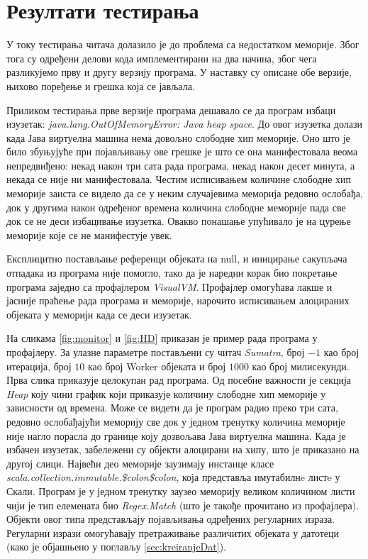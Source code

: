 \documentclass[12pt,oneside]{memoir}
\begin{document}
\section{Резултати тестирања}
\label{sec:rez}

У току тестирања читача долазило је до проблема са недостатком меморије. Због тога су одређени делови кода имплементирани на два начина, због чега разликујемо прву и другу верзију програма. У наставку су описане обе верзије, њихово поређење и грешка која се јављала.

Приликом тестирања прве верзије програма дешавало се да програм избаци изузетак: \textit{java.lang.OutOfMemoryError: Java heap space}. До овог изузетка долази када Јава виртуелна машина нема довољно слободне хип меморије. Оно што је било збуњујуће при појављивању ове грешке је што се она манифестовала веома непредвиђено: некад након три сата рада програма, некад након десет минута, а некада се није ни манифестовала. Честим исписивањем количине слободне хип меморије заиста се видело да се у неким случајевима меморија редовно ослобађа, док у другима након одређеног времена количина слободне меморије пада све док се не деси избацивање изузетка. Овакво понашање упућивало је на цурење меморије које се не манифестује увек.

Експлицитно постављање референци објеката на null, и иницирање сакупљача отпадака из програма није помогло, тако да је наредни корак био покретање програма заједно са профајлером \textit{VisualVM}. Профајлер омогућава лакше и јасније праћење рада програма и меморије, нарочито исписивањем алоцираних објеката у меморији када се деси изузетак. 

На сликама \ref{fig:monitor} и \ref{fig:HD} приказан је пример рада програма у профајлеру. За улазне параметре постављени су читач \textit{Sumatra}, број $-1$ као број итерација, број $10$ као број Worker објеката и број $1000$ као број милисекунди. Прва слика приказује целокупан рад програма. Од посебне важности је секција \textit{Heap} коју чини график који приказује количину слободне хип меморије у зависности од времена. Може се видети да је програм радио преко три сата, редовно ослобађајући меморију све док у једном тренутку количина меморије није нагло порасла до границе коју дозвољава Јава виртуелна машина. Када је избачен изузетак, забележени су објекти алоцирани на хипу, што је приказано на другој слици. Највећи део меморије заузимају инстанце класе \textit{scala.collection.immutable.\$colon\$colon}, која представља имутабилнe листe у Скали. Програм је у једном тренутку заузео меморију великом количином листи чији је тип елемената био \textit{Regex.Match} (што је такође прочитано из профајлера). Објекти овог типа представљају појављивања одређених регуларних израза. Регуларни изрази  омогућавају претраживање различитих објеката у датотеци (како је објашњено у поглављу \ref{sec:kreiranjeDat}).
\end{document}
